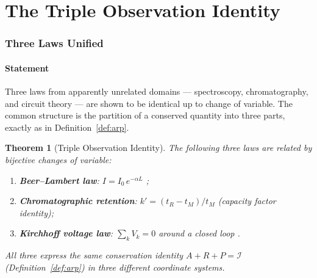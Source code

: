 \documentclass[11pt,twocolumn,a4paper]{article}
\theoremstyle{plain}
\newtheorem{theorem}{Theorem}[section]
\theoremstyle{definition}
\theoremstyle{remark}
\begin{document}
\part{The Triple Observation Identity}

\section{Three Laws Unified}
\label{sec:triple-identity}

\subsection{Statement}

Three laws from apparently unrelated domains — spectroscopy, chromatography, and circuit theory — are shown to be identical up to change of variable. The common structure is the partition of a conserved quantity into three parts, exactly as in Definition~\ref{def:arp}.

\begin{theorem}[Triple Observation Identity]
\label{thm:triple-identity}
The following three laws are related by bijective changes of variable:
\begin{enumerate}[label=(\roman*)]
  \item \textbf{Beer--Lambert law}: $I = I_0\,e^{-\alpha L}$ \cite{Beer1852, Lambert1760};
  \item \textbf{Chromatographic retention}: $k' = (t_R - t_M)/t_M$ (capacity factor identity);
  \item \textbf{Kirchhoff voltage law}: $\sum_k V_k = 0$ around a closed loop \cite{Kirchhoff1845}.
\end{enumerate}
All three express the same conservation identity $A+R+P=\mathcal{I}$ (Definition~\ref{def:arp}) in three different coordinate systems.
\end{theorem}
\end{document}
